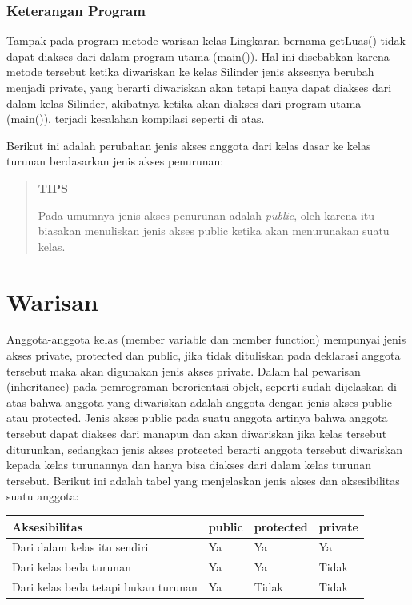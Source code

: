\subsubsection*{Keterangan Program}

Tampak pada program metode warisan kelas Lingkaran bernama getLuas()
tidak dapat diakses dari dalam program utama (main()). Hal ini
disebabkan karena metode tersebut ketika diwariskan ke kelas Silinder
jenis aksesnya berubah menjadi private, yang berarti diwariskan akan
tetapi hanya dapat diakses dari dalam kelas Silinder, akibatnya ketika
akan diakses dari program utama (main()), terjadi kesalahan kompilasi
seperti di atas.

Berikut ini adalah perubahan jenis akses anggota dari kelas dasar ke
kelas turunan berdasarkan jenis akses penurunan:

\begin{quotation}
{\LARGE {}} \textbf{TIPS}

	Pada
	umumnya jenis akses penurunan adalah \emph{public}, oleh karena itu
	biasakan menuliskan jenis akses public ketika akan menurunakan suatu
	kelas.
\end{quotation}


\section{Warisan}\label{warisan}

Anggota-anggota kelas (member variable dan member function) mempunyai
jenis akses private, protected dan public, jika tidak dituliskan pada
deklarasi anggota tersebut maka akan digunakan jenis akses private.
Dalam hal pewarisan (inheritance) pada pemrograman berorientasi objek,
seperti sudah dijelaskan di atas bahwa anggota yang diwariskan adalah
anggota dengan jenis akses public atau protected. Jenis akses public
pada suatu anggota artinya bahwa anggota tersebut dapat diakses dari
manapun dan akan diwariskan jika kelas tersebut diturunkan, sedangkan
jenis akses protected berarti anggota tersebut diwariskan kepada kelas
turunannya dan hanya bisa diakses dari dalam kelas turunan tersebut.
Berikut ini adalah tabel yang menjelaskan jenis akses dan aksesibilitas
suatu anggota:

\begin{longtable}[]{@{}llll@{}}
\toprule
Aksesibilitas & public & protected & private\tabularnewline
\midrule
\endhead
Dari dalam kelas itu sendiri & Ya & Ya & Ya\tabularnewline
Dari kelas beda turunan & Ya & Ya & Tidak\tabularnewline
Dari kelas beda tetapi bukan turunan & Ya & Tidak & Tidak\tabularnewline
\bottomrule
\end{longtable}

